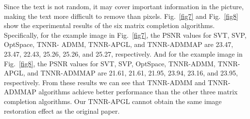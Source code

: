 \documentclass[fontset=windows]{article}
\begin{document}
{Since the text is not random, it may cover important information in the picture, making the text more difficult to remove than pixels. Fig.~\ref{fig7} and Fig.~\ref{fig8} show the experimental results of the six matrix
completion algorithms. Specifically, for the example image
in Fig.~\ref{fig7}, the PSNR values for SVT, SVP, OptSpace, TNNR-
ADMM, TNNR-APGL, and TNNR-ADMMAP are 23.47,
23.47, 22.43, 25.26, 25.26, and 25.27, respectively. And for the
example image in Fig.~\ref{fig8}, the PSNR values for SVT, SVP,
OptSpace, TNNR-ADMM, TNNR-APGL, and TNNR-ADMMAP are 21.61, 21.61, 21.95, 23.94, 23.16, and 23.95, respectively. 
From these results we can see that TNNR-ADMM and TNNR-ADMMAP algorithms achieve better performance than the other three matrix completion algorithms. Our TNNR-APGL cannot obtain the same image restoration effect as the original paper.




}
\end{document}

